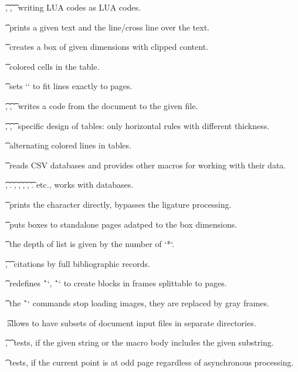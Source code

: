 {{\tpg[beglua]\t\beglua, \t\begLUA, \t\logginglua\ writing LUA codes as LUA codes.

\tpg[cancel]\t\cancel\ prints a given text and the line/cross line over the text.

\tpg[clipbox]\t\clipbox\ creates a box of given dimensions with clipped content.

\tpg[colortab]\t{}\
colored cells in the table.

\tpg[correctvsize]\t\correctvsize\
sets `\vsize` to fit lines exactly to pages.

\tpg[begfile]\t\createfile, \t\begfile, \t\endfile\
writes a code from the document to the given file.

\tpg[booktabs]\t\crtop, \t\crmid, \t\crbot\
specific design of tables: only horizontal rules with different thickness.

\tpg[colorlin]\t\crx\
alternating colored lines in tables.

\tpg[csvread]\t\csvread\
reads CSV databases and provides other macros for working with their data.

\tpg[csvread]\t\dbitem, \tpg[dbwhere]\t\dbwhere. \tpg[dbloop]\t\dbloop, \t\dbsort,
\tpg[dbcreate]\t\dbcreate, \t\dbinsert, \tpg[dbshow]\t\dbshow. etc.,
works with databases.

\tpg[directchar]\t\directchar\
prints the character directly, bypasses the ligature processing.

\tpg[directoutput]\t\directoutput\
puts boxes to standalone pages adatped to the box dimensions.

\tpg[easylist]\t\easylist\
the depth of list is given by the number of `*`.

\tpg[fullcite]\t\fcread, \t\fullcite\
citations by full bibliographic records.

\tpg[greyblock]\t\framedblocks\
redefines \^`\begblock`, \^`\endblock` to create blocks in frames splittable to pages.

\tpg[ignoreinspic]\t\ignoreinspic\
the \^`\inspic` commands stop loading images, they are replaced by gray frames.

\tpg[import]\t\
allows to have subsets of document input files in separate directories.

\tpg[ismatch]\t\ismatch, \t\isinmacro\
tests, if the given string or the macro body includes the given substring.

\tpg[ispageodd]\t\ispageodd\
tests, if the current point is at odd page regardless of asynchronous processing.

}}
